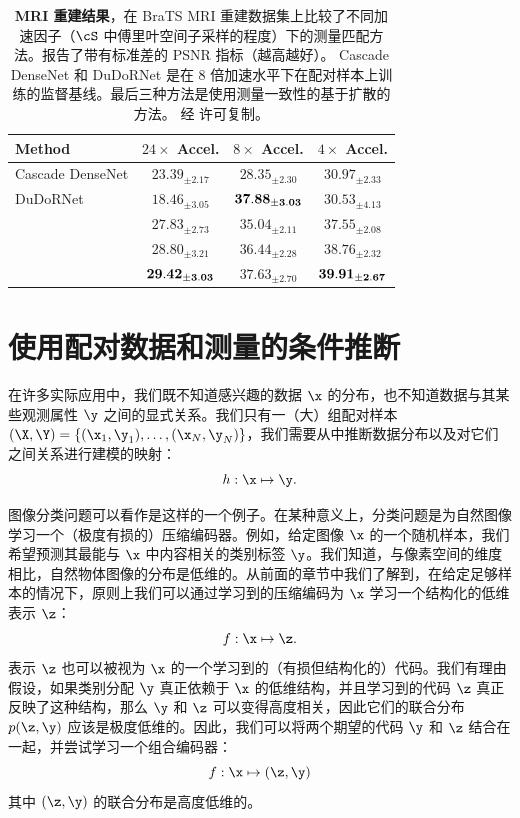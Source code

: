 \documentclass[../../book-main_zh.tex]{subfiles}
\begin{document}
\begin{table}[t]
    \centering
    \begin{tabular}{@{}lccc@{}}
        \toprule
        Method & $24\times$ Accel. & $8\times$ Accel. & $4\times$ Accel. \\
        \midrule
        Cascade DenseNet & $23.39_{\pm 2.17}$ & $28.35_{\pm 2.30}$ &
        $30.97_{\pm 2.33}$ \\
        DuDoRNet & $18.46_{\pm 3.05}$ & $\bf 37.88_{\pm 3.03}$ &
        $30.53_{\pm 4.13}$ \\
        \textcite{song2020score} & $27.83_{\pm 2.73}$ & $35.04_{\pm
        2.11}$ & $37.55_{\pm 2.08}$ \\
        \textcite{NEURIPS2021_7d6044e9} & $28.80_{\pm 3.21}$ &
        $36.44_{\pm 2.28}$ & $38.76_{\pm 2.32}$ \\
        \textcite{song2022solving} & $\bf 29.42_{\pm 3.03}$ &
        $37.63_{\pm 2.70}$ & $\bf 39.91_{\pm 2.67}$ \\
        \bottomrule
    \end{tabular}
    \caption{\textbf{MRI 重建结果}，在 BraTS MRI 重建数据集上比较了不同加速因子（$\cS$ 中傅里叶空间子采样的程度）下的测量匹配方法。报告了带有标准差的 PSNR 指标（越高越好）。
        Cascade DenseNet
        \cite{NEURIPS2019_1e48c442} 和 DuDoRNet \cite{9156506} 是在 8 倍加速水平下在配对样本上训练的监督基线。最后三种方法是使用测量一致性的基于扩散的方法。
    经 \textcite{song2022solving} 许可复制。}
    \label{tab:mri-reconstruction}
\end{table}

\section{使用配对数据和测量的条件推断}
\label{sec:paired-data}
在许多实际应用中，我们既不知道感兴趣的数据 $\x$ 的分布，也不知道数据与其某些观测属性 $\y$ 之间的显式关系。我们只有一（大）组配对样本 $(\X, \Y) =
\{ (\x_1, \y_1), \ldots, (\x_N, \y_N) \}$，我们需要从中推断数据分布以及对它们之间关系进行建模的映射：
\begin{equation}
    h: \x \mapsto \y.
\end{equation}

图像分类问题可以看作是这样的一个例子。在某种意义上，分类问题是为自然图像学习一个（极度有损的）压缩编码器。例如，给定图像 $\x$ 的一个随机样本，我们希望预测其最能与 $\x$ 中内容相关的类别标签 $\y$。我们知道，与像素空间的维度相比，自然物体图像的分布是低维的。从前面的章节中我们了解到，在给定足够样本的情况下，原则上我们可以通过学习到的压缩编码为 $\x$ 学习一个结构化的低维表示 $\z$：
\begin{equation}
    f: \x \mapsto \z.
\end{equation}
表示 $\z$ 也可以被视为 $\x$ 的一个学习到的（有损但结构化的）代码。我们有理由假设，如果类别分配 $\y$ 真正依赖于 $\x$ 的低维结构，并且学习到的代码 $\z$ 真正反映了这种结构，那么 $\y$ 和 $\z$ 可以变得高度相关，因此它们的联合分布 $p(\z, \y)$ 应该是极度低维的。因此，我们可以将两个期望的代码 $\y$ 和 $\z$ 结合在一起，并尝试学习一个组合编码器：
\begin{equation}
    f: \x \mapsto (\z, \y)
\end{equation}
其中 $(\z, \y)$ 的联合分布是高度低维的。
\end{document}
